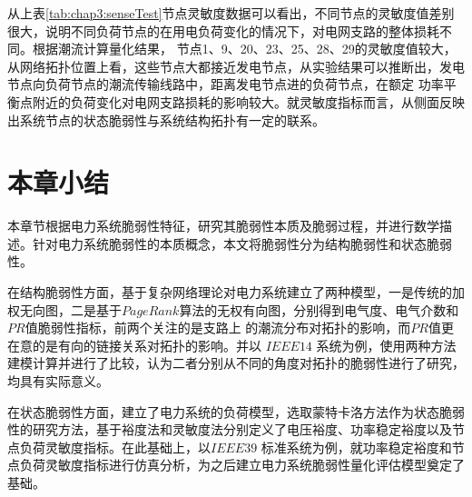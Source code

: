 从上表\ref{tab:chap3:senseTest}节点灵敏度数据可以看出，不同节点的灵敏度值差别很大，说明不同负荷节点的在用电负荷变化的情况下，对电网支路的整体损耗不同。根据潮流计算量化结果，
节点1、9、20、23、25、28、29的灵敏度值较大，从网络拓扑位置上看，这些节点大都接近发电节点，从实验结果可以推断出，发电节点向负荷节点的潮流传输线路中，距离发电节点进的负荷节点，在额定
功率平衡点附近的负荷变化对电网支路损耗的影响较大。就灵敏度指标而言，从侧面反映出系统节点的状态脆弱性与系统结构拓扑有一定的联系。




\section{本章小结}
\label{sec:sum3}

本章节根据电力系统脆弱性特征，研究其脆弱性本质及脆弱过程，并进行数学描述。针对电力系统脆弱性的本质概念，本文将脆弱性分为结构脆弱性和状态脆弱性。

在结构脆弱性方面，基于复杂网络理论对电力系统建立了两种模型，一是传统的加权无向图，二是基于$PageRank$算法的无权有向图，分别得到电气度、电气介数和$PR$值脆弱性指标，前两个关注的是支路上
的潮流分布对拓扑的影响，而$PR$值更在意的是有向的链接关系对拓扑的影响。并以 $IEEE14$ 系统为例，使用两种方法建模计算并进行了比较，认为二者分别从不同的角度对拓扑的脆弱性进行了研究，
均具有实际意义。

在状态脆弱性方面，建立了电力系统的负荷模型，选取蒙特卡洛方法作为状态脆弱性的研究方法，基于裕度法和灵敏度法分别定义了电压裕度、功率稳定裕度以及节点负荷灵敏度指标。在此基础上，以$IEEE39$
标准系统为例，就功率稳定裕度和节点负荷灵敏度指标进行仿真分析，为之后建立电力系统脆弱性量化评估模型奠定了基础。



